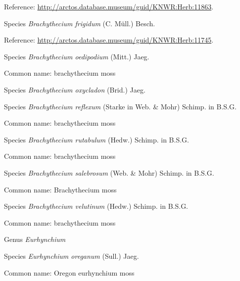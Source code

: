 \documentclass[9pt, article]{memoir}
\begin{document}
\begin{multicols}{2}
Reference: 
\url{http://arctos.database.museum/guid/KNWR:Herb:11863}.

\vspace{6pt}\noindent\hspace{36pt}Species \textit{Brachythecium frigidum} (C. Müll.) Besch.


Reference: 
\url{http://arctos.database.museum/guid/KNWR:Herb:11745}.

\vspace{6pt}\noindent\hspace{36pt}Species \textit{Brachythecium oedipodium} (Mitt.) Jaeg.


Common name: brachythecium moss

\vspace{6pt}\noindent\hspace{36pt}Species \textit{Brachythecium oxycladon} (Brid.) Jaeg.


\vspace{6pt}\noindent\hspace{36pt}Species \textit{Brachythecium reflexum} (Starke in Web. \& Mohr) Schimp. in B.S.G.


Common name: brachythecium moss

\vspace{6pt}\noindent\hspace{36pt}Species \textit{Brachythecium rutabulum} (Hedw.) Schimp. in B.S.G.


Common name: brachythecium moss

\vspace{6pt}\noindent\hspace{36pt}Species \textit{Brachythecium salebrosum} (Web. \& Mohr) Schimp. in B.S.G.


Common name: Brachythecium moss

\vspace{6pt}\noindent\hspace{36pt}Species \textit{Brachythecium velutinum} (Hedw.) Schimp. in B.S.G.


Common name: brachythecium moss

\vspace{6pt}\noindent\hspace{30pt}Genus \textit{Eurhynchium}


\vspace{6pt}\noindent\hspace{36pt}Species \textit{Eurhynchium oreganum} (Sull.) Jaeg.


Common name: Oregon eurhynchium moss


\end{multicols}
\end{document}
